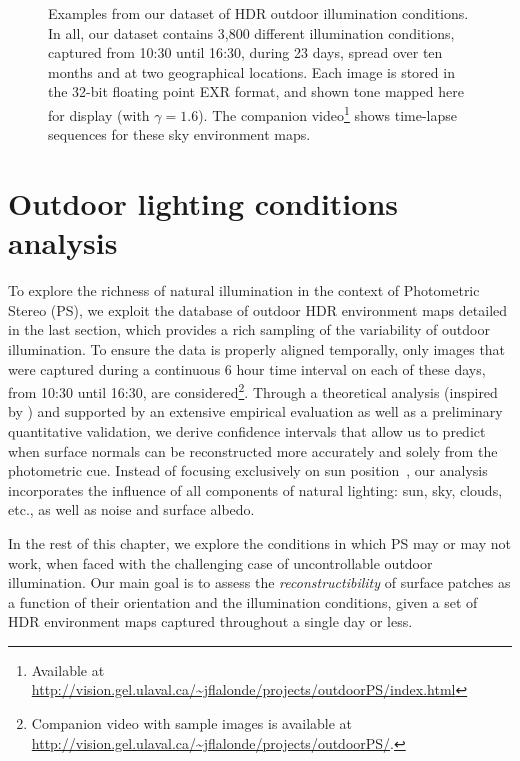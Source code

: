 \begin{figure}
\begin{tabular}{@{}rcccccccccccc@{}}
    \\

    \end{tabular}
    \caption[HDRDB dataset excerpt]{Examples from our dataset of HDR outdoor illumination conditions. In all, our dataset contains 3,800 different illumination conditions, captured from 10{:}30 until 16{:}30, during 23 days, spread over ten months and at two geographical locations. Each image is stored in the 32-bit floating point EXR format, and shown tone mapped here for display (with $\gamma = 1.6$). The companion video\footnote{Available at \url{http://vision.gel.ulaval.ca/~jflalonde/projects/outdoorPS/index.html}} shows time-lapse sequences for these sky environment maps.}
    \label{fig:database}
\end{figure}

\section{Outdoor lighting conditions analysis}

To explore the richness of natural illumination in the context of Photometric Stereo (PS), we exploit the database of outdoor HDR environment maps detailed in the last section, which provides a rich sampling of the variability of outdoor illumination. To ensure the data is properly aligned temporally, only images that were captured during a continuous 6 hour time interval on each of these days, from 10{:}30 until 16{:}30, are considered\footnote{Companion video with sample images is available at \url{http://vision.gel.ulaval.ca/~jflalonde/projects/outdoorPS/}.}. Through a theoretical analysis (inspired by \cite{sun-ivc-07}) and supported by an extensive empirical evaluation as well as a preliminary quantitative validation, we derive confidence intervals that allow us to predict when surface normals can be reconstructed more accurately and solely from the photometric cue. Instead of focusing exclusively on sun position~\cite{shen-pg-14}, our analysis incorporates the influence of all components of natural lighting: sun, sky, clouds, etc., as well as noise and surface albedo.

In the rest of this chapter, we explore the conditions in which PS may or may not work, when faced with the challenging case of uncontrollable outdoor illumination. Our main goal is to assess the \emph{reconstructibility} of surface patches as a function of their orientation and the illumination conditions, given a set of HDR environment maps captured throughout a single day or less.

